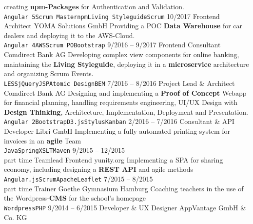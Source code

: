 \documentclass[9pt]{developercv} %
\begin{document}
\begin{entrylist}
{      creating \textbf{npm-Packages} for Authentication and Validation.\\ 
      \texttt{Angular 5}\slashsep\texttt{Scrum Master}\slashsep\texttt{npm}\slashsep\texttt{Living Styleguide}\slashsep\texttt{Scrum}
    }
  \entry
		{10/2017}
		{Frontend Architect}
		{YOMA Solutions GmbH}
		{
      Providing a POC \textbf{Data Warehouse} for car dealers and deploying it to the AWS-Cloud.\\
      \texttt{Angular 4}\slashsep\texttt{AWS}\slashsep\texttt{Scrum PO}\slashsep\texttt{Bootstrap}
    }
  \entry
		{9/2016 -- 9/2017}
		{Frontend Consultant}
		{Comdirect Bank AG}
		{
      Developing complex view components for online banking, maintaining the \textbf{Living Styleguide},
      deploying it in a \textbf{microservice} architecture and organizing Scrum Events.\\
      \texttt{LESS}\slashsep\texttt{jQuery}\slashsep\texttt{JSP}\slashsep\texttt{Atomic Design}\slashsep\texttt{BEM}
    }
  \entry
		{7/2016 -- 8/2016}
		{Project Lead \& Architect}
		{Comdirect Bank AG}
		{
      Designing and implementing a \textbf{Proof of Concept} Webapp for financial planning, handling
      requirements engineering, UI/UX Design with \textbf{Design Thinking}, Architecture, Implementation, Deployment
      and Presentation.\\
      \texttt{Angular 2}\slashsep\texttt{Bootstrap}\slashsep\texttt{D3.js}\slashsep\texttt{Stylus}\slashsep\texttt{Kanban}
    }
  \entry
		{2/2016 -- 7/2016}
		{Consultant \& API Developer}
		{Libri GmbH}
		{
      Implementing a fully automated printing system for invoices in an \textbf{agile} Team\\
      \texttt{Java}\slashsep\texttt{Spring}\slashsep\texttt{XSLT}\slashsep\texttt{Maven}
    }
  \entry
		{9/2015 -- 12/2015\\\footnotesize{part time}}
		{Teamlead Frontend}
		{yunity.org}
		{
      Implementing a SPA for sharing economy, including designing a \textbf{REST API} and agile methods\\
      \texttt{Angular.js}\slashsep\texttt{Scrum}\slashsep\texttt{Apache}\slashsep\texttt{Leaflet}
    }
  \entry
		{7/2015 -- 8/2015\\\footnotesize{part time}}
		{Trainer}
		{Goethe Gymnasium Hamburg}
		{
      Coaching teachers in the use of the Wordpress-\textbf{CMS} for the school's homepage\\
      \texttt{Wordpress}\slashsep\texttt{PHP}
    }
  \entry
		{9/2014 -- 6/2015}
		{Developer \& UX Designer}
		{AppVantage GmbH \& Co. KG}

\end{entrylist}
\end{document}
